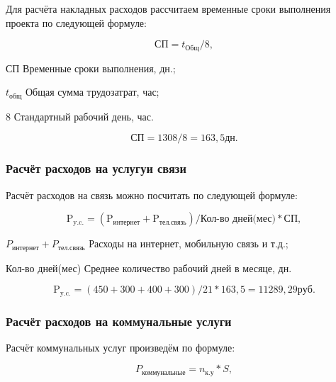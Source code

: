 Для расчёта накладных расходов рассчитаем временные сроки выполнения проекта по следующей
формуле:

\begin{equation}
    \text{СП} = t_\text{Общ} / 8,
\end{equation}

\begin{eqexpl}[5ex]
    \item{СП} Временные сроки выполнения, дн.;
    \item{$t_\text{общ}$} Общая сумма трудозатрат, час;
    \item{8} Стандартный рабочий день, час.
\end{eqexpl}

\begin{equation*}
    \text{СП} = 1308 / 8 = 163,5 дн.
\end{equation*}

\subsubsection{Расчёт расходов на услугуи связи}

Расчёт расходов на связь можно посчитать по следующей формуле:

\begin{equation}
    \text{P}_\text{y.c.} = (\text{P}_\text{интернет} + \text{P}_\text{тел.связь}) / \text{Кол-во дней(мес)} * \text{СП},
\end{equation}

\begin{eqexpl}[18ex]
    \item{$P_\text{интернет} + P_\text{тел.связь}$} Расходы на интернет, мобильную связь и т.д.;
    \item{Кол-во дней(мес)} Среднее количество рабочий дней в месяце, дн.
\end{eqexpl}

\begin{equation*}
    \text{P}_\text{y.c.} = (450 + 300 + 400 + 300) / 21 * 163,5 = 11289,29 руб.
\end{equation*}

\subsubsection{Расчёт расходов на коммунальные услуги}

Расчёт коммунальных услуг произведём по формуле:

\begin{equation}
    P_\text{коммунальные} = n_\text{к.у} * S,
\end{equation}

